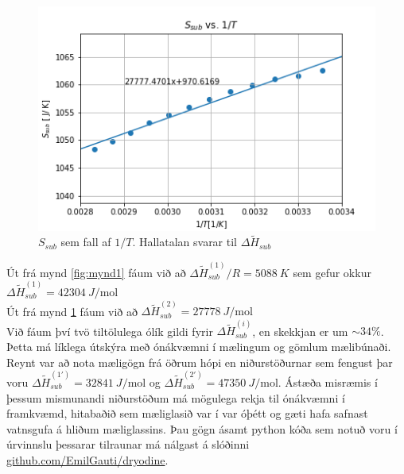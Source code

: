 \documentclass[11pt]{article}
\begin{document}
\begin{figure}[H]
    \centering
    \includegraphics[scale=0.8]{mynd2.png}
    \caption{$S_{sub}$ sem fall af $1/T$. Hallatalan svarar til $\Delta \widetilde{H}_{sub}$}
    \label{fig:mynd2}
\end{figure}

Út frá mynd \ref{fig:mynd1} fáum við að $\Delta \widetilde{H}_{sub}^{(1)}/R = \SI{5088}{K}$ sem gefur okkur $\Delta \widetilde{H}^{(1)}_{sub} = \SI{42304}{J\per\mol}$\\

Út frá mynd \ref{fig:mynd2} fáum við að $\Delta \widetilde{H}^{(2)}_{sub} = \SI{27778}{J\per\mol}$\\

Við fáum því tvö tiltölulega ólík gildi fyrir $\Delta \widetilde{H}^{(i)}_{sub}$, en skekkjan er um $\sim 34\%$. Þetta má líklega útskýra með ónákvæmni í mælingum og gömlum mælibúnaði. Reynt var að nota mæligögn frá öðrum hópi en niðurstöðurnar sem fengust þar voru $\Delta \widetilde{H}^{(1')}_{sub} = \SI{32841}{J\per\mol}$ og $\Delta \widetilde{H}^{(2')}_{sub} = \SI{47350}{J\per\mol}$. Ástæða misræmis í þessum mismunandi niðurstöðum má mögulega rekja til ónákvæmni í framkvæmd, hitabaðið sem mæliglasið var í var óþétt og gæti hafa safnast vatnsgufa á hliðum mæliglassins. Þau gögn ásamt python kóða sem notuð voru í úrvinnslu þessarar tilraunar má nálgast á slóðinni \hyperlink{https://github.com/EmilGauti/dryodine}{github.com/EmilGauti/dryodine}.
\end{document}
